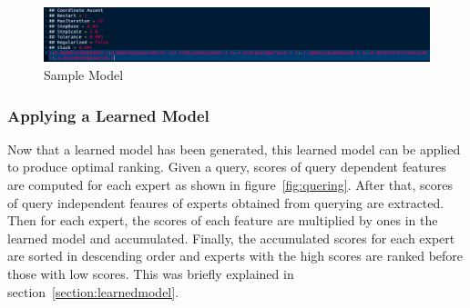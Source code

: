 \begin{figure}
\centering
\includegraphics[scale=0.3]{./figures/samplemodel.png}
\caption{Sample Model} \label{fig:samplemodel} 
\end{figure}

\subsubsection{Applying a Learned Model}\label{section:applyinglearnedmodel}
Now that a learned model has been generated, this learned model can be applied to produce optimal ranking. Given a query,
scores of query dependent features are computed for each expert as shown in figure~\ref{fig:quering}. After that, scores of query independent feaures
of experts obtained from querying are extracted. Then for each expert, the scores of each feature are multiplied by ones in the learned model and accumulated.
Finally, the accumulated scores for each expert are sorted in descending order and experts with the high scores are ranked before those with low scores. 
This was briefly explained in section~\ref{section:learnedmodel}.

